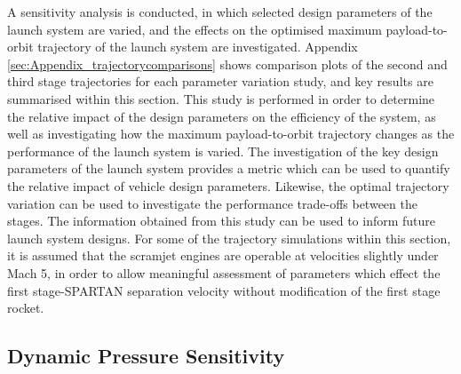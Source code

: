 A sensitivity analysis is conducted, in which selected design parameters of the launch system are varied, and the effects on the optimised maximum payload-to-orbit trajectory of the launch system are investigated. Appendix \ref{sec:Appendix_trajectorycomparisons} shows comparison plots of the second and third stage trajectories for each parameter variation study, and key results are summarised within this section. 
This study is performed in order to determine the relative impact of the design parameters on the efficiency of the system, as well as investigating how the maximum payload-to-orbit trajectory changes as the performance of the launch system is varied. The investigation of the key design parameters of the launch system provides a metric which can be used to quantify the relative impact of vehicle design parameters. Likewise, the optimal trajectory variation can be used to investigate the performance trade-offs between the stages. 
The information obtained from this study can be used to inform future launch system designs. 
For some of the trajectory simulations within this section, it is assumed that the scramjet engines are operable at velocities slightly under Mach 5, in order to allow meaningful assessment of parameters which effect the first stage-SPARTAN separation velocity without modification of the first stage rocket.

\subsection{Dynamic Pressure Sensitivity}\label{sec:qvariation}

